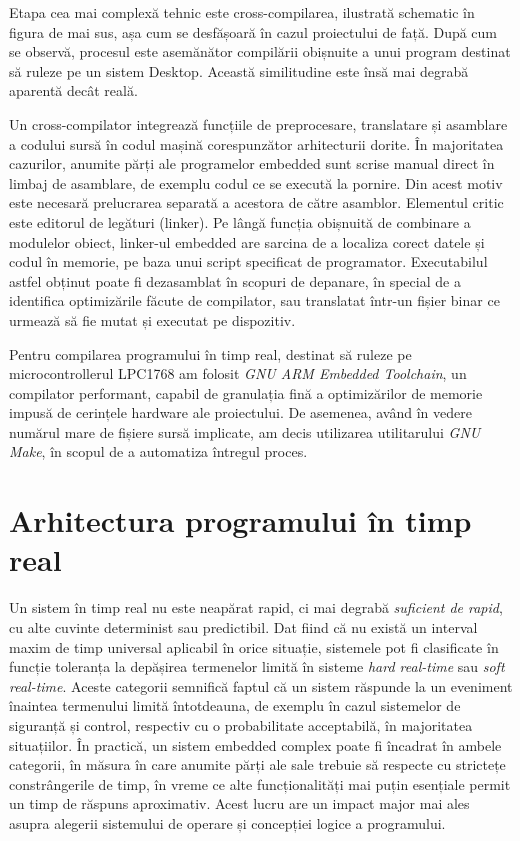 
Etapa cea mai complexă tehnic este cross-compilarea, ilustrată schematic în figura de mai sus, așa cum se desfășoară în cazul proiectului de față. După cum se observă, procesul este asemănător compilării obișnuite a unui program destinat să ruleze pe un sistem Desktop. Această similitudine este însă mai degrabă aparentă decât reală.

Un cross-compilator integrează funcțiile de preprocesare, translatare și asamblare a codului sursă în codul mașină corespunzător arhitecturii dorite. În majoritatea cazurilor, anumite părți ale programelor embedded sunt scrise manual direct în limbaj de asamblare, de exemplu codul ce se execută la pornire. Din acest motiv este necesară prelucrarea separată a acestora de către asamblor. Elementul critic este editorul de legături (linker). Pe lângă funcția obișnuită de combinare a modulelor obiect, linker-ul embedded are sarcina de a localiza corect datele și codul în memorie, pe baza unui script specificat de programator. Executabilul astfel obținut poate fi dezasamblat în scopuri de depanare, în special de a identifica optimizările făcute de compilator, sau translatat într-un fișier binar ce urmează să fie mutat și executat pe dispozitiv. \cite{noergaard}

Pentru compilarea programului în timp real, destinat să ruleze pe microcontrollerul LPC1768 am folosit \textit{GNU ARM Embedded Toolchain}, un compilator performant, capabil de granulația fină a optimizărilor de memorie impusă de cerințele hardware ale proiectului. De asemenea, având în vedere numărul mare de fișiere sursă implicate, am decis utilizarea utilitarului \textit{GNU Make}, în scopul de a automatiza întregul proces.


\section{Arhitectura programului în timp real}

Un sistem în timp real nu este neapărat rapid, ci mai degrabă \textit{suficient de rapid}, cu alte cuvinte determinist sau predictibil. Dat fiind că nu există un interval maxim de timp universal aplicabil în orice situație, sistemele pot fi clasificate în funcție toleranța la depășirea termenelor limită în sisteme \textit{hard real-time} sau \textit{soft real-time}. Aceste categorii semnifică faptul că un sistem răspunde la un eveniment înaintea termenului limită întotdeauna, de exemplu în cazul sistemelor de siguranță și control, respectiv cu o probabilitate acceptabilă, în majoritatea situațiilor. În practică, un sistem embedded complex poate fi încadrat în ambele categorii, în măsura în care anumite părți ale sale trebuie să respecte cu strictețe constrângerile de timp, în vreme ce alte funcționalități mai puțin esențiale permit un timp de răspuns aproximativ. Acest lucru are un impact major mai ales asupra alegerii sistemului de operare și concepției logice a programului. \cite{walls}

